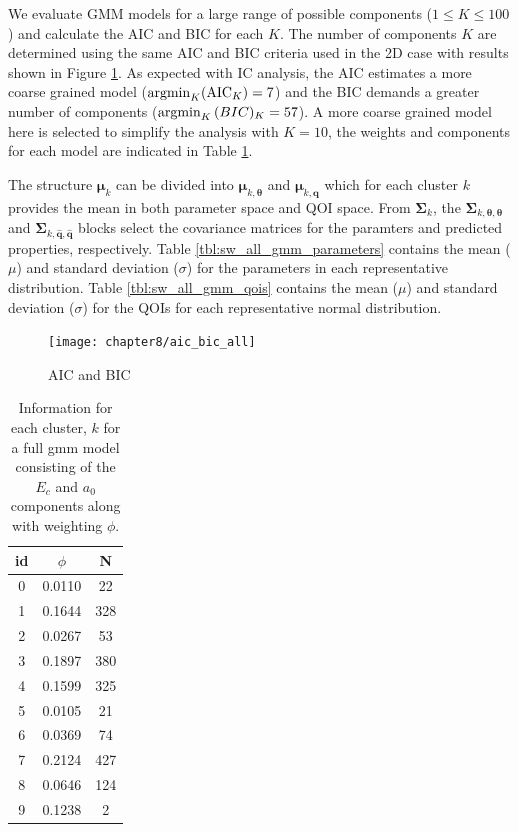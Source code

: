 We evaluate GMM models for a large range of possible components ($1 \leq K \leq 100$) and calculate the AIC and BIC for each $K$.  The number of components $K$ are determined using the same AIC and BIC criteria used in the 2D case with results shown in
Figure \ref{fig:Si_aic_bic_all}.  As expected with IC analysis, the AIC estimates a more coarse grained model ($\operatorname*{argmin}_K(\text{AIC}_K) = 7$) and the BIC demands a greater number of components ($\operatorname*{argmin}_K{\text(BIC)_K} = 57$).
A more coarse grained model here is selected to simplify the analysis with $K=10$, the weights and components for each model are indicated in Table \ref{tbl:sw_all_gmm}.

The structure $\bm{\mu}_k$ can be divided into $\bm{\mu}_{k,\bm{\theta}}$ and $\bm{\mu}_{k,\hat{\bm{q}}}$ which for each cluster $k$ provides the mean in both parameter space and QOI space.
From $\bm{\Sigma}_k$, the $\bm{\Sigma}_{k,\bm{\theta}, \bm{\theta}}$ and $\bm{\Sigma}_{k,\hat{\bm{q}}, \hat{\bm{q}}}$ blocks select the covariance matrices for the paramters and predicted properties, respectively.
Table \ref{tbl:sw_all_gmm_parameters} contains the mean ($\mu$) and standard deviation ($\sigma$) for the parameters in each representative distribution.  Table \ref{tbl:sw_all_gmm_qois} contains the mean ($\mu$) and standard deviation ($\sigma$) for the QOIs for each representative normal distribution.


\begin{figure}[hbt]
	\centering
	\captionsetup{justification=centering,margin=1in}
	\texttt{[image: chapter8/aic\_bic\_all]}
	\caption{AIC and BIC}
	\label{fig:Si_aic_bic_all}
\end{figure}

\begin{table}[ht]
	\centering
	\caption{Information for each cluster, $k$  for a full gmm model consisting of the $E_c$ and $a_0$ components along with weighting $\phi$.}
	\label{tbl:sw_all_gmm}
	\begin{tabular}{c c c}
    \hline
    id & $\phi$ & N\\
    \hline
    0 & 0.0110 & 22\\
    1 & 0.1644 & 328\\
    2 & 0.0267 & 53\\
    3 & 0.1897 & 380\\
    4 & 0.1599 & 325\\
    5 & 0.0105 & 21 \\
    6 & 0.0369 & 74 \\
    7 & 0.2124 & 427 \\
    8 & 0.0646 & 124 \\
    9 & 0.1238 & 2 \\
    \hline
  \end{tabular}
\end{table}

